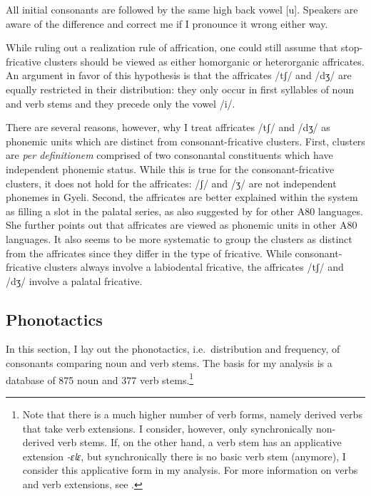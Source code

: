 \noindent All initial consonants are followed by the same high back vowel [u]. Speakers are aware of the difference and correct me if I pronounce it wrong either way.

While ruling out a realization rule of affrication, one could still assume that stop-fricative clusters should be viewed as either homorganic or heterorganic affricates. An argument in favor of this hypothesis is that the affricates /tʃ/ and /dʒ/ are equally restricted in their distribution: they only occur in first syllables of noun and verb stems and they precede only the vowel /i/.

There are several reasons, however, why I treat affricates /tʃ/ and /dʒ/ as phonemic units which are distinct from consonant-fricative clusters. First, clusters are {\itshape per definitionem} comprised of two consonantal constituents which have independent phonemic status. While this is true for the consonant-fricative clusters, it does not hold for the affricates: /ʃ/ and /ʒ/ are not independent phonemes in Gyeli. Second, the affricates are better explained within the system as filling a slot in the palatal series, as also suggested by \citet[335]{cheucle2014} for other A80 languages. She further points out that affricates are viewed as phonemic units in other A80 languages. It also seems to be more systematic to group the clusters as distinct from the affricates since they differ in the type of fricative. While consonant-fricative clusters always involve a labiodental fricative, the affricates /tʃ/ and /dʒ/ involve a palatal fricative.









\subsection{Phonotactics}
\label{sec:Phonotact}


In this section, I lay out the phonotactics, i.e.\ distribution and frequency, of consonants comparing noun and verb stems. The basis for my analysis is a database of 875 noun and 377 verb stems.\footnote{Note that there is a much higher number of verb forms, namely derived verbs that take verb extensions. I consider, however, only synchronically non-derived verb stems. If, on the other hand, a verb stem has an applicative extension {\itshape -ɛlɛ}, but synchronically there is no basic verb stem (anymore), I consider this applicative form in my analysis. For more information on verbs and verb extensions, see .} 

